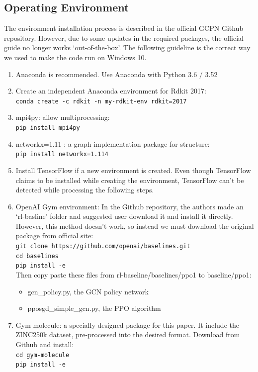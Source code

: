\documentclass{article}
\begin{document}
\subsection{Operating Environment}
The environment installation process is described in the official GCPN Github repository. However, due to some updates in the required packages, the official guide no longer works `out-of-the-box'. The following guideline is the correct way we used to make the code run on Windows 10.
\begin{enumerate}
    \item Anaconda is recommended. Use Anaconda with Python 3.6 / 3.52
    \item Create an independent Anaconda environment for Rdkit 2017:\\ \texttt{conda create -c rdkit -n my-rdkit-env rdkit=2017}
    \item mpi4py: allow multiprocessing:\\
    \texttt{pip install mpi4py}
    \item networkx=1.11 : a graph implementation package for structure:\\
    \texttt{pip install  networkx=1.114}
    \item Install TensorFlow if a new environment is created. Even though TensorFlow claims to be installed while creating the environment, TensorFlow can’t be detected while processing the following steps.
    \item OpenAI Gym environment: In the Github repository, the authors made an `rl-basline' folder and suggested user download it and install it directly. However, this method doesn’t work, so instead we must download the original package from official site:\\
    \texttt{git clone https://github.com/openai/baselines.git}\\
    \texttt{cd baselines}\\
    \texttt{pip install -e}\\
    Then copy paste these files from rl-baseline/baselines/ppo1 to baseline/ppo1:          \begin{itemize}
        \item gcn\_policy.py, the GCN policy network
        \item pposgd\_simple\_gcn.py, the PPO algorithm
    \end{itemize}
    \item Gym-molecule: a specially designed package for this paper. It include the ZINC250k dataset, pre-processed into the desired format. Download from Github and install:\\
    \texttt{cd gym-molecule}\\
    \texttt{pip install -e}
\end{enumerate}
\end{document}
